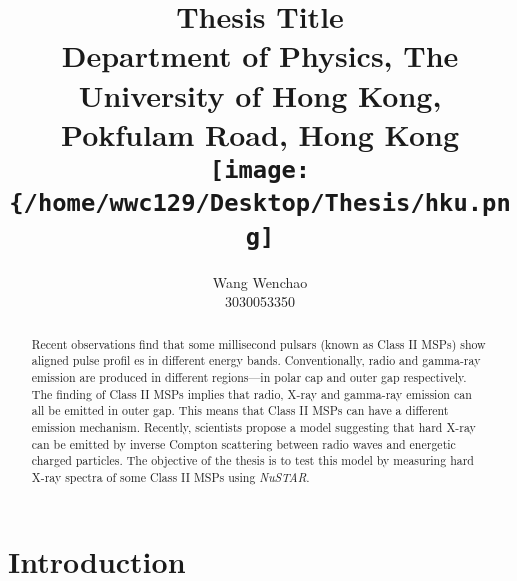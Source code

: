 \documentclass[12pt]{report}
\title{\textbf{Thesis Title}\\ \vspace{1cm}
			{\large Department of Physics, The University of Hong Kong, Pokfulam Road, Hong Kong}\\ \vspace{1cm}
			{\texttt{[image: \{/home/wwc129/Desktop/Thesis/hku.png]}}}\\ \vspace{3cm}
}
\date{}
\author{Wang Wenchao  \\3030053350}
\begin{document}
\maketitle
\tableofcontents{}

\begin{abstract}
    \normalsize
    Recent observations find that some millisecond pulsars (known as Class II MSPs) show aligned pulse profil
    es in 
    different energy bands. Conventionally, radio and gamma-ray emission are produced in different 
    regions---in polar cap 
    and outer gap respectively. The finding of Class II MSPs implies that radio, X-ray and gamma-ray 
    emission 
    can all be emitted in outer gap. This means that Class II MSPs can have a different emission mechanism. 
    Recently, 
    scientists propose a model suggesting that hard X-ray can be emitted by inverse Compton scattering 
    between radio
    waves and energetic charged particles. The objective of the thesis is to test this model by measuring 
    hard X-ray 
    spectra of some Class II MSPs using \textit{NuSTAR}. 
\end{abstract}
			
		
		
\chapter{Introduction}   	   
\end{document}
